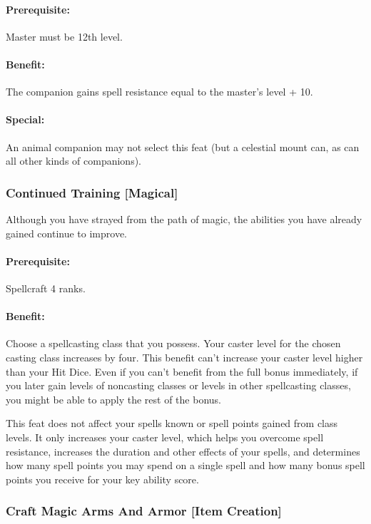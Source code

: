 \paragraph{Prerequisite:} Master must be 12th level.

\paragraph{Benefit:} The companion gains spell resistance equal to the master's level + 10.

\paragraph{Special:} An animal companion may not select this feat (but a celestial mount can, as can all other kinds of companions).
\subsubsection[Continued Training]{Continued Training [Magical]}
\label{Feat:ContinuedTraining}
Although you have strayed from the path of magic, the abilities you have already gained continue to improve.

\paragraph{Prerequisite:} Spellcraft 4 ranks.

\paragraph{Benefit:} Choose a spellcasting class that you possess.
Your caster level for the chosen casting class increases by four. 
This benefit can't increase your caster level higher than your Hit Dice. 
Even if you can't benefit from the full bonus immediately, if you later gain levels of noncasting classes or levels in other spellcasting classes, you might be able to apply the rest of the bonus.

This feat does not affect your spells known or spell points gained from class levels. 
It only increases your caster level, which helps you overcome spell resistance, increases the duration and other effects of your spells, and determines how many spell points you may spend on a single spell and how many bonus spell points you receive for your key ability score.
\subsubsection[Craft Magic Arms And Armor]{Craft Magic Arms And Armor [Item Creation]}
\label{Feat:CraftMagicArmsAndArmor}
